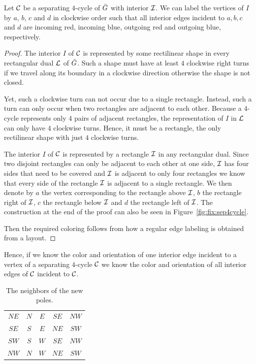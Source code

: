   \begin{lemma}
    \label{lm:fix:fourCycleInteriorColor}
    Let $\mathcal{C}$ be a separating $4$-cycle of $\bar{G}$ with interior $\mathcal{I}$. We can label the vertices of $I$ by $a$, $b$, $c$ and $d$ in clockwise order such that all interior edges incident to $a, b, c$ and $d$ are incoming red, incoming blue, outgoing red and outgoing blue, respectively.
  \end{lemma}
  \begin{proof}
    The interior $I$ of $\mathcal{C}$ is represented by some rectilinear shape in every rectangular dual $\mathcal{L}$ of $\bar{G}$. Such a shape must have at least $4$ clockwise right turns if we travel along its boundary in a clockwise direction otherwise the shape is not closed.

    Yet, such a clockwise turn can not occur due to a single rectangle. Instead, such a turn can only occur when two rectangles are adjacent to each other. Because a $4$-cycle represents only $4$ pairs of adjacent rectangles, the representation of $I$ in $\mathcal{L}$ can only have $4$ clockwise turns. Hence, it must be a rectangle, the only rectilinear shape with just $4$ clockwise turns.

    The interior $I$ of $\mathcal{C}$ is represented by a rectangle $\mathcal{I}$ in any rectangular dual. Since two disjoint rectangles can only be adjacent to each other at one side, $\mathcal{I}$ has four sides that need to be covered and $\mathcal{I}$ is adjacent to only four rectangles we know that every side of the rectangle $\mathcal{I}$ is adjacent to a single rectangle. We then denote by $a$ the vertex corresponding to the rectangle above $\mathcal{I}$, $b$ the rectangle right of $\mathcal{I}$, $c$ the rectangle below $\mathcal{I}$ and $d$ the rectangle left of $\mathcal{I}$.
    The construction at the end of the proof can also be seen in Figure~\ref{fig:fix:sep4cycle}.

    Then the required coloring follows from how a regular edge labeling is obtained from a layout.
  \end{proof}

  Hence, if we know the color and orientation of one interior edge incident to a vertex of a separating $4$-cycle $\mathcal{C}$ we know the color and orientation of all interior edges of $\mathcal{C}$ incident to $\mathcal{C}$.

    \begin{table}
      \centering
      \begin{tabular}{c|| c c c c}
        $NE$ & $N$ & $ E$ & $ SE$ & $ NW$ \\
        $SE$ & $S$ & $ E$ & $ NE$ & $ SW$\\
        $SW$ & $S$ & $ W$ & $ SE$ & $ NW$\\
        $NW$ & $N$ & $ W$ & $ NE$ & $ SW$\\
      \end{tabular}
      \caption{The neighbors of the new poles.}
      \label{tab:scaffold}
    \end{table}

